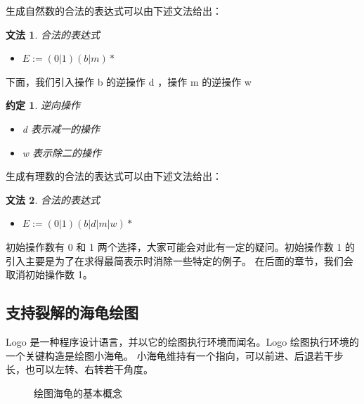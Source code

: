\documentclass[a4paper,12pt]{article}
\newtheorem{grammar}{文法}
\newtheorem{convention}{约定}
\begin{document}
生成自然数的合法的表达式可以由下述文法给出：

\begin{grammar}
\label{g1}
合法的表达式
\begin{itemize}
\item $E := (0 | 1)(b | m)*$
\end{itemize}
\end{grammar}

下面，我们引入操作 b 的逆操作 d ，操作 m 的逆操作 w

\begin{convention}
逆向操作
\begin{itemize}
\item d 表示减一的操作
\item w 表示除二的操作
\end{itemize}
\end{convention}

生成有理数的合法的表达式可以由下述文法给出：

\begin{grammar}
\label{g1}
合法的表达式
\begin{itemize}
\item $E := (0 | 1)(b | d | m | w)*$
\end{itemize}
\end{grammar}

初始操作数有 0 和 1 两个选择，大家可能会对此有一定的疑问。初始操作数 1 的引入主要是为了在求得最简表示时消除一些特定的例子。
在后面的章节，我们会取消初始操作数 1。

\subsection{支持裂解的海龟绘图}

Logo 是一种程序设计语言，并以它的绘图执行环境而闻名。Logo 绘图执行环境的一个关键构造是绘图小海龟。
小海龟维持有一个指向，可以前进、后退若干步长，也可以左转、右转若干角度。

\begin{figure}[ht]
\centering
{}
\caption{绘图海龟的基本概念}
\end{figure}
\end{document}
